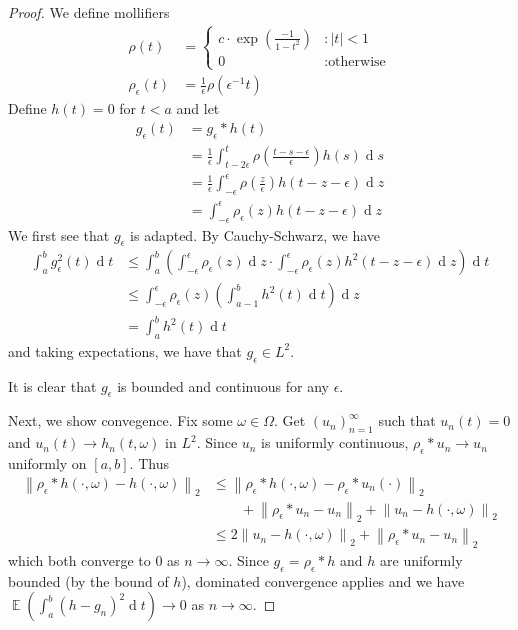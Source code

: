 \documentclass[11pt, a4paper]{memoir}
\newcommand{\agspace}{\ensuremath{\phantom{--}}}
\newcommand{\norm}[1]{\ensuremath{\left\lVert#1\right\rVert}}
\theoremstyle{change}
\theoremstyle{plain}
\theoremstyle{nonumberplain}
\newtheorem{proof}{Proof}
\DeclareMathOperator{\E}{{\mathbb{E}}}
\renewcommand{\d}[1]{\ensuremath{\operatorname{d}\!{#1}}}
\numberwithin{equation}{section}
\begin{document}
\begin{proof}
    We define mollifiers
    \begin{align*}
        \rho(t)&=
        \begin{cases}
            c\cdot\exp\left(\frac{-1}{1-t^2}\right) &:|t|<1\\
            0 &:\text{otherwise}
        \end{cases}\\
        \rho_\epsilon(t)&=\frac{1}{\epsilon}\rho(\epsilon^{-1}t)
    \end{align*}
    Define $h(t)=0$ for $t<a$ and let
    \begin{align*}
        g_\epsilon(t)&=g_\epsilon * h(t)\\
                     &= \frac{1}{\epsilon}\int_{t-2\epsilon}^t\rho\left(\frac{t-s-\epsilon}{\epsilon}\right)h(s)\d{s}\\
                     &= \frac{1}{\epsilon}\int_{-\epsilon}^{\epsilon}\rho\left(\frac{z}{\epsilon}\right)h(t-z-\epsilon)\d{z}\\
                     &= \int_{-\epsilon}^{\epsilon}\rho_\epsilon(z)h(t-z-\epsilon)\d{z}
    \end{align*}
    We first see that $g_\epsilon$ is adapted.
    By Cauchy-Schwarz, we have
    \begin{align*}
        \int_a^b g_\epsilon^2(t)\d{t} &\leq \int_a^b\left(\int_{-\epsilon}^\epsilon\rho_\epsilon(z)\d{z}\cdot\int_{-\epsilon}^\epsilon\rho_\epsilon(z)h^2(t-z-\epsilon)\d{z}\right)\d{t}\\
                                      &\leq \int_{-\epsilon}^\epsilon\rho_\epsilon(z)\left(\int_{a-1}^b h^2(t)\d{t}\right)\d{z}\\
                                      &= \int_a^b h^2(t)\d{t}
    \end{align*}
    and taking expectations, we have that $g_\epsilon\in L^2$.

    It is clear that $g_\epsilon$ is bounded and continuous for any $\epsilon$.

    Next, we show convegence.
    Fix some $\omega\in\Omega$.
    Get $(u_n)_{n=1}^\infty$ such that $u_n(t)=0$ and $u_n(t)\to h_n(t,\omega)$ in $L^2$.
    Since $u_n$ is uniformly continuous, $\rho_\epsilon*u_n\to u_n$ uniformly on $[a,b]$.
    Thus
    \begin{align*}
        \norm{\rho_\epsilon*h(\cdot,\omega)-h(\cdot,\omega)}_2 &\leq\norm{\rho_\epsilon*h(\cdot,\omega)-\rho_\epsilon*u_n(\cdot)}_2\\
                                                               &\agspace+\norm{\rho_\epsilon*u_n-u_n}_2+\norm{u_n-h(\cdot,\omega)}_2\\
                                                               &\leq 2\norm{u_n-h(\cdot,\omega)}_2+\norm{\rho_\epsilon*u_n-u_n}_2
    \end{align*}
    which both converge to $0$ as $n\to\infty$.
    Since $g_\epsilon=\rho_\epsilon*h$ and $h$ are uniformly bounded (by the bound of $h$), dominated convergence applies and we have $\E(\int_a^b(h-g_n)^2\d{t})\to 0$ as $n\to\infty$.
\end{proof}
\end{document}
